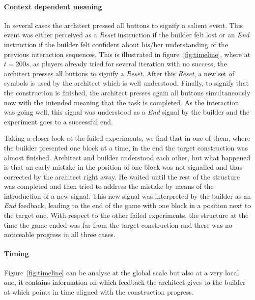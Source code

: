 \paragraph{Context dependent meaning} In several cases the architect pressed all buttons to signify a salient event. This event was either perceived as a \emph{Reset} instruction if the builder felt lost or an \emph{End} instruction if the builder felt confident about his/her understanding of the previous interaction sequences. This is illustrated in figure~\ref{fig:timeline}, where at $t=200 s$, as players already tried for several iteration with no success, the architect presses all buttons to signify a \emph{Reset}. After this \emph{Reset}, a new set of symbols is used by the architect which is well understood. Finally, to signify that the construction is finished, the architect presses again all buttons simultaneously now with the intended meaning that the task is completed. As the interaction was going well, this signal was understood as a \emph{End} signal by the builder and the experiment goes to a successful end.

Taking a closer look at the failed experiments, we find that in one of them, where the builder presented one block at a time, in the end the target construction was almost finished. Architect and builder understood each other, but what happened is that an early mistake in the position of one block was not signalled and thus corrected by the architect right away. He waited until the rest of the structure was completed and then tried to address the mistake by means of the introduction of a new signal. This new signal was interpreted by the builder as an \emph{End} feedback, leading to the end of the game with one block in a position next to the target one. With respect to the other failed experiments, the structure at the time the game ended was far from the target construction and there was no noticeable progress in all three cases.

\paragraph{Timing} Figure~\ref{fig:timeline} can be analyse at the global scale but also at a very local one, it contains information on which feedback the architect gives to the builder at which points in time aligned with the construction progress. 

